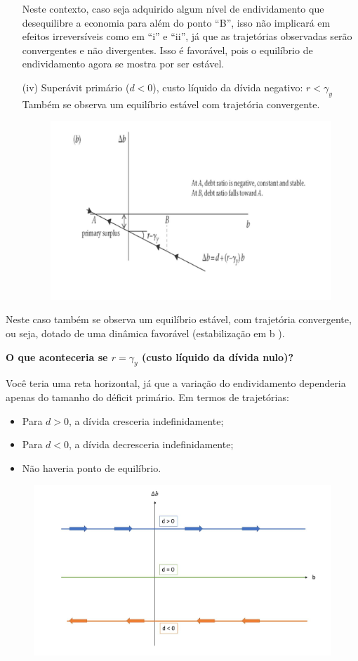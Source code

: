 \documentclass[a4paper,12pt]{article}[abntex2]
\begin{document}
\begin{itemize}
Neste contexto, caso seja adquirido algum nível de endividamento que desequilibre a economia para além do ponto “B”, isso não implicará em efeitos irreversíveis como em “i” e “ii”, já que as trajetórias observadas serão convergentes e não divergentes. Isso é favorável, pois o equilíbrio de endividamento agora se mostra por ser estável. 
  
  \item[(iv)] Superávit primário ($d < 0$), custo líquido da dívida negativo: $r < \gamma_y$ \\
  Também se observa um equilíbrio estável com trajetória convergente.
  
  \begin{figure}[H]
    \centering
    \includegraphics[width=0.7\linewidth]{Imagens/a18i9.png}
\end{figure}
\end{itemize}

Neste caso também se observa um equilíbrio estável, com trajetória convergente, ou seja, dotado de uma dinâmica favorável (estabilização em b ). 

\textbf{O que aconteceria se $r = \gamma_y$ (custo líquido da dívida nulo)?}

Você teria uma reta horizontal, já que a variação do endividamento dependeria apenas do tamanho do déficit primário. Em termos de trajetórias:
\begin{itemize}
  \item Para $d > 0$, a dívida cresceria indefinidamente;
  \item Para $d < 0$, a dívida decresceria indefinidamente;
  \item Não haveria ponto de equilíbrio.
\end{itemize}

\begin{figure}[H]
    \centering
    \includegraphics[width=0.7\linewidth]{Imagens/a19i1.png}
\end{figure}
\end{document}
